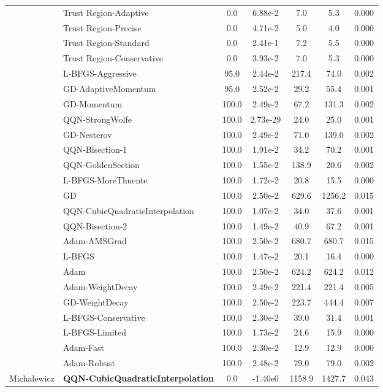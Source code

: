 \documentclass{article}
\begin{document}
\begin{table}[htbp]
{\begin{tabular}{p{2.5cm}p{2.5cm}*{5}{c}}
 & Trust Region-Adaptive & 0.0 & 6.88e-2 & 7.0 & 5.3 & 0.000 \\
 & Trust Region-Precise & 0.0 & 4.71e-2 & 5.0 & 4.0 & 0.000 \\
 & Trust Region-Standard & 0.0 & 2.41e-1 & 7.2 & 5.5 & 0.000 \\
 & Trust Region-Conservative & 0.0 & 3.93e-2 & 7.0 & 5.3 & 0.000 \\
 & L-BFGS-Aggressive & 95.0 & 2.44e-2 & 217.4 & 74.0 & 0.002 \\
 & GD-AdaptiveMomentum & 95.0 & 2.52e-2 & 29.2 & 55.4 & 0.001 \\
 & GD-Momentum & 100.0 & 2.49e-2 & 67.2 & 131.3 & 0.002 \\
 & QQN-StrongWolfe & 100.0 & 2.73e-29 & 24.0 & 25.0 & 0.001 \\
 & GD-Nesterov & 100.0 & 2.49e-2 & 71.0 & 139.0 & 0.002 \\
 & QQN-Bisection-1 & 100.0 & 1.91e-2 & 34.2 & 70.2 & 0.001 \\
 & QQN-GoldenSection & 100.0 & 1.55e-2 & 138.9 & 20.6 & 0.002 \\
 & L-BFGS-MoreThuente & 100.0 & 1.72e-2 & 20.8 & 15.5 & 0.000 \\
 & GD & 100.0 & 2.50e-2 & 629.6 & 1256.2 & 0.015 \\
 & QQN-CubicQuadraticInterpolation & 100.0 & 1.07e-2 & 34.0 & 37.6 & 0.001 \\
 & QQN-Bisection-2 & 100.0 & 1.49e-2 & 40.9 & 67.2 & 0.001 \\
 & Adam-AMSGrad & 100.0 & 2.50e-2 & 680.7 & 680.7 & 0.015 \\
 & L-BFGS & 100.0 & 1.47e-2 & 20.1 & 16.4 & 0.000 \\
 & Adam & 100.0 & 2.50e-2 & 624.2 & 624.2 & 0.012 \\
 & Adam-WeightDecay & 100.0 & 2.49e-2 & 221.4 & 221.4 & 0.005 \\
 & GD-WeightDecay & 100.0 & 2.50e-2 & 223.7 & 444.4 & 0.007 \\
 & L-BFGS-Conservative & 100.0 & 2.30e-2 & 39.0 & 31.4 & 0.001 \\
 & L-BFGS-Limited & 100.0 & 1.73e-2 & 24.6 & 15.9 & 0.000 \\
 & Adam-Fast & 100.0 & 2.30e-2 & 12.9 & 12.9 & 0.000 \\
 & Adam-Robust & 100.0 & 2.48e-2 & 79.0 & 79.0 & 0.002 \\
\midrule
\multirow{25}{*}{Michalewicz} & \textbf{QQN-CubicQuadraticInterpolation} & 0.0 & -1.40e0 & 1158.9 & 1427.7 & 0.043 \\

\end{tabular}}
\end{table}
\end{document}
